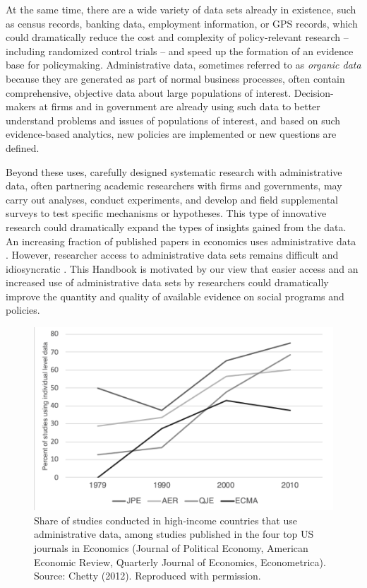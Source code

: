 At the same time, there are a wide variety of data sets already in existence, such as census records, banking data, employment information, or GPS records, which could dramatically reduce the cost and complexity of policy-relevant research -- including randomized control trials -- and speed up the formation of an evidence base for policymaking. Administrative data, sometimes referred to as \emph{organic data} \citep{groves2011} because they are generated as part of normal business processes, often contain comprehensive, objective data about large populations of interest. Decision-makers at firms and in government are already using such data to better understand problems and issues of populations of interest, and based on such evidence-based analytics, new policies are implemented or new questions are defined.

Beyond these uses, carefully designed systematic research with administrative data, often partnering academic researchers with firms and governments, may carry out analyses, conduct experiments, and develop and field supplemental surveys to test specific mechanisms or hypotheses. This type of innovative research could dramatically expand the types of insights gained from the data. An increasing fraction of published papers in economics uses administrative data \citep[see Figure \ref{fig:introchetty},][]{chetty2012}. However, researcher access to administrative data sets remains difficult and idiosyncratic \citep{card2010}. This Handbook is motivated by our view that easier access and an increased use of administrative data sets by researchers could dramatically improve the quantity and quality of available evidence on social programs and policies.

\begin{figure}[t]
\centering
\includegraphics{figures/Chetty-graph.pdf}
\caption{\label{fig:introchetty}Share of studies conducted in high-income countries that use administrative data, among studies published in the four top US journals in Economics (Journal of Political Economy, American Economic Review, Quarterly Journal of Economics, Econometrica). Source: Chetty (2012). Reproduced with permission.}
\end{figure}

